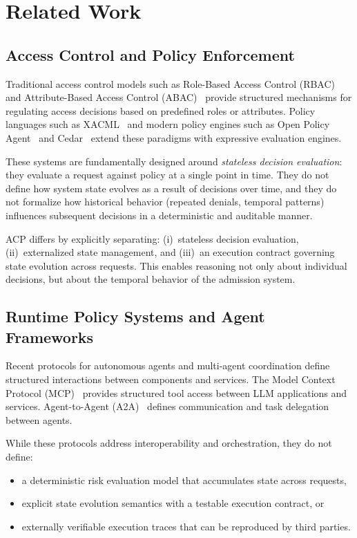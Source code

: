 \documentclass[11pt]{article}
\theoremstyle{definition}
\begin{document}
\section{Related Work}
\label{sec:related-work}

\subsection{Access Control and Policy Enforcement}

Traditional access control models such as Role-Based Access Control (RBAC)~\cite{sandhu1996rbac}
and Attribute-Based Access Control (ABAC)~\cite{hu2015abac} provide structured mechanisms for
regulating access decisions based on predefined roles or attributes.
Policy languages such as XACML~\cite{oasis2013xacml} and modern policy engines such as
Open Policy Agent~\cite{opa} and Cedar~\cite{cedar} extend these paradigms with expressive
evaluation engines.

These systems are fundamentally designed around \emph{stateless decision evaluation}:
they evaluate a request against policy at a single point in time.
They do not define how system state evolves as a result of decisions over time,
and they do not formalize how historical behavior (repeated denials, temporal patterns)
influences subsequent decisions in a deterministic and auditable manner.

ACP differs by explicitly separating:
(i)~stateless decision evaluation,
(ii)~externalized state management, and
(iii)~an execution contract governing state evolution across requests.
This enables reasoning not only about individual decisions, but about the temporal behavior
of the admission system.

\subsection{Runtime Policy Systems and Agent Frameworks}

Recent protocols for autonomous agents and multi-agent coordination define structured interactions
between components and services.
The Model Context Protocol (MCP)~\cite{mcp} provides structured tool access between LLM applications and services.
Agent-to-Agent (A2A)~\cite{a2a} defines communication and task delegation between agents.

While these protocols address interoperability and orchestration, they do not define:
\begin{itemize}[noitemsep]
  \item a deterministic risk evaluation model that accumulates state across requests,
  \item explicit state evolution semantics with a testable execution contract, or
  \item externally verifiable execution traces that can be reproduced by third parties.
\end{itemize}
\end{document}
